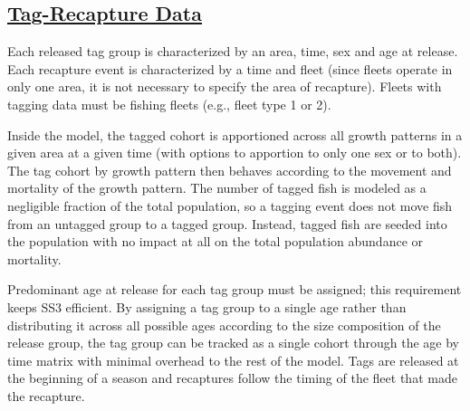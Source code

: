 \hypertarget{tag-recapture}{}
\subsection[Tag-Recapture Data]{\protect\hyperlink{tag-recapture}{Tag-Recapture Data}}
Each released tag group is characterized by an area, time, sex and age at release. Each recapture event is characterized by a time and fleet (since fleets operate in only one area, it is not necessary to specify the area of recapture). Fleets with tagging data must be fishing fleets (e.g., fleet type 1 or 2). 

Inside the model, the tagged cohort is apportioned across all growth patterns in a given area at a given time (with options to apportion to only one sex or to both). The tag cohort by growth pattern then behaves according to the movement and mortality of the growth pattern. The number of tagged fish is modeled as a negligible fraction of the total population, so a tagging event does not move fish from an untagged group to a tagged group. Instead, tagged fish are seeded into the population with no impact at all on the total population abundance or mortality. 

Predominant age at release for each tag group must be assigned; this requirement keeps SS3 efficient. By assigning a tag group to a single age rather than distributing it across all possible ages according to the size composition of the release group, the tag group can be tracked as a single cohort through the age by time matrix with minimal overhead to the rest of the model. Tags are released at the beginning of a season and recaptures follow the timing of the fleet that made the recapture.

